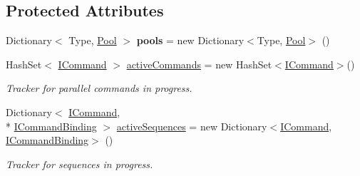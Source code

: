 \subsection*{Protected Attributes}
\begin{DoxyCompactItemize}
\item 
\hypertarget{classstrange_1_1extensions_1_1command_1_1impl_1_1_command_binder_ab3bddee94cadd3048189e1e5cd59ead9}{Dictionary$<$ Type, \hyperlink{classstrange_1_1extensions_1_1pool_1_1impl_1_1_pool}{Pool} $>$ {\bfseries pools} = new Dictionary$<$Type, \hyperlink{classstrange_1_1extensions_1_1pool_1_1impl_1_1_pool}{Pool}$>$ ()}\label{classstrange_1_1extensions_1_1command_1_1impl_1_1_command_binder_ab3bddee94cadd3048189e1e5cd59ead9}

\item 
\hypertarget{classstrange_1_1extensions_1_1command_1_1impl_1_1_command_binder_a8b6b770089f105b017000c9957aa7125}{Hash\-Set$<$ \hyperlink{interfacestrange_1_1extensions_1_1command_1_1api_1_1_i_command}{I\-Command} $>$ \hyperlink{classstrange_1_1extensions_1_1command_1_1impl_1_1_command_binder_a8b6b770089f105b017000c9957aa7125}{active\-Commands} = new Hash\-Set$<$\hyperlink{interfacestrange_1_1extensions_1_1command_1_1api_1_1_i_command}{I\-Command}$>$()}\label{classstrange_1_1extensions_1_1command_1_1impl_1_1_command_binder_a8b6b770089f105b017000c9957aa7125}

\begin{DoxyCompactList}\small\item\em Tracker for parallel commands in progress. \end{DoxyCompactList}\item 
\hypertarget{classstrange_1_1extensions_1_1command_1_1impl_1_1_command_binder_ada066db5cf3c3014735a7874260ed4b1}{Dictionary$<$ \hyperlink{interfacestrange_1_1extensions_1_1command_1_1api_1_1_i_command}{I\-Command}, \\*
\hyperlink{interfacestrange_1_1extensions_1_1command_1_1api_1_1_i_command_binding}{I\-Command\-Binding} $>$ \hyperlink{classstrange_1_1extensions_1_1command_1_1impl_1_1_command_binder_ada066db5cf3c3014735a7874260ed4b1}{active\-Sequences} = new Dictionary$<$\hyperlink{interfacestrange_1_1extensions_1_1command_1_1api_1_1_i_command}{I\-Command}, \hyperlink{interfacestrange_1_1extensions_1_1command_1_1api_1_1_i_command_binding}{I\-Command\-Binding}$>$ ()}\label{classstrange_1_1extensions_1_1command_1_1impl_1_1_command_binder_ada066db5cf3c3014735a7874260ed4b1}

\begin{DoxyCompactList}\small\item\em Tracker for sequences in progress. \end{DoxyCompactList}\end{DoxyCompactItemize}
